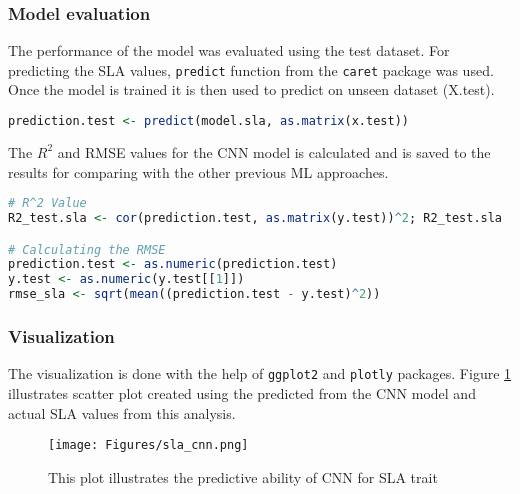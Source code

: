 \documentclass[12pt,a4paper]{report}
\begin{document}
\subsubsection*{Model evaluation}
The performance of the model was evaluated using the test dataset. For predicting the SLA values, \texttt{predict} function from the \texttt{caret} package was used. Once the model is trained it is then used to predict on unseen dataset (X.test). \\

\begin{lstlisting}[language=R, style=mystyle]
prediction.test <- predict(model.sla, as.matrix(x.test))
\end{lstlisting}

The $R^2$ and RMSE values for the CNN model is calculated and is saved to the results for comparing with the other previous ML approaches. \\

\begin{lstlisting}[language=R, style=mystyle]
# R^2 Value
R2_test.sla <- cor(prediction.test, as.matrix(y.test))^2; R2_test.sla

# Calculating the RMSE
prediction.test <- as.numeric(prediction.test)
y.test <- as.numeric(y.test[[1]])
rmse_sla <- sqrt(mean((prediction.test - y.test)^2))
\end{lstlisting}

\subsubsection*{Visualization}
The visualization is done with the help of \texttt{ggplot2} and \texttt{plotly} packages. Figure \ref{fig:sla_cnn} illustrates scatter plot created using the predicted from the CNN model and actual SLA values from this analysis.\\

\begin{figure}[h]
    \centering
    \texttt{[image: Figures/sla\_cnn.png]}
    \caption{This plot illustrates the predictive ability of CNN for SLA trait}
    \label{fig:sla_cnn}
\end{figure}
\end{document}
